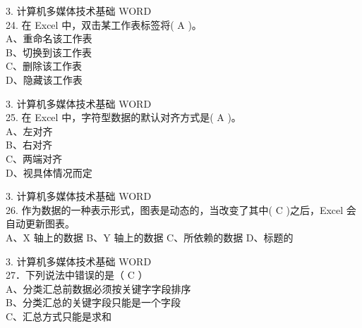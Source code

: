 \documentclass[aspectratio=169]{beamer}
\begin{document}
\begin{frame}[t]{3. 计算机多媒体技术基础} \vspace{20pt}
    WORD\\

24. 在 Excel 中，双击某工作表标签将( A )。\\
A、重命名该工作表\\ B、切换到该工作表\\
C、删除该工作表\\ D、隐藏该工作表\\
\end{frame}




\begin{frame}[t]{3. 计算机多媒体技术基础} \vspace{20pt}
    WORD\\

25. 在 Excel 中，字符型数据的默认对齐方式是( A )。\\
A、左对齐\\ B、右对齐\\ C、两端对齐\\ D、视具体情况而定\\

\end{frame}

\begin{frame}[t]{3. 计算机多媒体技术基础} \vspace{20pt}
    WORD\\

26. 作为数据的一种表示形式，图表是动态的，当改变了其中( C )之后，Excel 会自动更新图表。\\
A、X 轴上的数据 B、Y 轴上的数据 C、所依赖的数据 D、标题的\\
\end{frame}



\begin{frame}[t]{3. 计算机多媒体技术基础} \vspace{20pt}
    WORD\\
27．下列说法中错误的是（ C ）\\
A、分类汇总前数据必须按关键字字段排序\\
B、分类汇总的关键字段只能是一个字段\\
C、汇总方式只能是求和\\
\end{frame}
\end{document}
